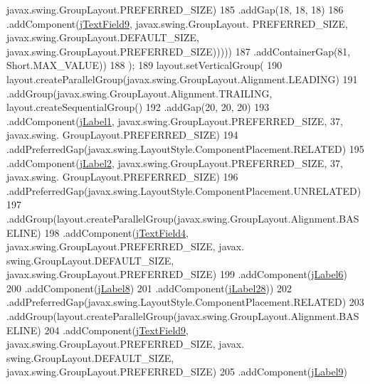 \begin{DoxyCode}
      javax.swing.GroupLayout.PREFERRED\_SIZE)
185                                 .addGap(18, 18, 18)
186                                 .addComponent(\mbox{\hyperlink{classinterfacessoguar_1_1paenrique_a381c34741919609d05e0045d816b5725}{jTextField9}}, javax.swing.GroupLayout.
      PREFERRED\_SIZE, javax.swing.GroupLayout.DEFAULT\_SIZE, javax.swing.GroupLayout.PREFERRED\_SIZE)))))
187                 .addContainerGap(81, Short.MAX\_VALUE))
188         );
189         layout.setVerticalGroup(
190             layout.createParallelGroup(javax.swing.GroupLayout.Alignment.LEADING)
191             .addGroup(javax.swing.GroupLayout.Alignment.TRAILING, layout.createSequentialGroup()
192                 .addGap(20, 20, 20)
193                 .addComponent(\mbox{\hyperlink{classinterfacessoguar_1_1paenrique_a69df573814db382c28d77ef7064da795}{jLabel1}}, javax.swing.GroupLayout.PREFERRED\_SIZE, 37, javax.swing.
      GroupLayout.PREFERRED\_SIZE)
194                 .addPreferredGap(javax.swing.LayoutStyle.ComponentPlacement.RELATED)
195                 .addComponent(\mbox{\hyperlink{classinterfacessoguar_1_1paenrique_a213ee92d0638dee5a178c9c6fcc5befc}{jLabel2}}, javax.swing.GroupLayout.PREFERRED\_SIZE, 37, javax.swing.
      GroupLayout.PREFERRED\_SIZE)
196                 .addPreferredGap(javax.swing.LayoutStyle.ComponentPlacement.UNRELATED)
197                 .addGroup(layout.createParallelGroup(javax.swing.GroupLayout.Alignment.BASELINE)
198                     .addComponent(\mbox{\hyperlink{classinterfacessoguar_1_1paenrique_a2302a6403a015e775096556c687e4fe1}{jTextField4}}, javax.swing.GroupLayout.PREFERRED\_SIZE, javax.
      swing.GroupLayout.DEFAULT\_SIZE, javax.swing.GroupLayout.PREFERRED\_SIZE)
199                     .addComponent(\mbox{\hyperlink{classinterfacessoguar_1_1paenrique_aefb6dc4d3f0f469be0d03f9f4c7326bb}{jLabel6}})
200                     .addComponent(\mbox{\hyperlink{classinterfacessoguar_1_1paenrique_ac20f17274561ba46a613d1f05c5bb218}{jLabel8}})
201                     .addComponent(\mbox{\hyperlink{classinterfacessoguar_1_1paenrique_ac87555268164c8333fa21ca04c5cb402}{jLabel28}}))
202                 .addPreferredGap(javax.swing.LayoutStyle.ComponentPlacement.RELATED)
203                 .addGroup(layout.createParallelGroup(javax.swing.GroupLayout.Alignment.BASELINE)
204                     .addComponent(\mbox{\hyperlink{classinterfacessoguar_1_1paenrique_a381c34741919609d05e0045d816b5725}{jTextField9}}, javax.swing.GroupLayout.PREFERRED\_SIZE, javax.
      swing.GroupLayout.DEFAULT\_SIZE, javax.swing.GroupLayout.PREFERRED\_SIZE)
205                     .addComponent(\mbox{\hyperlink{classinterfacessoguar_1_1paenrique_aeb67da672ddf8c985dec99dc697b750c}{jLabel9}})

\end{DoxyCode}

